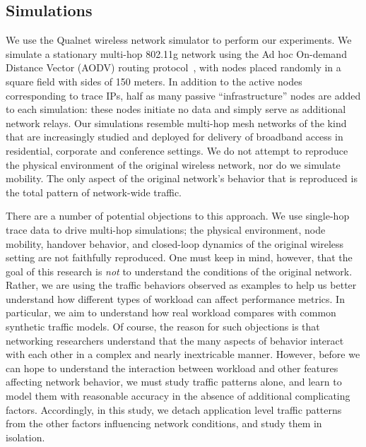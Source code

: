 \documentclass[conference]{IEEEtran}
\newcommand{\caps}[1]{{\small{#1}}}
\begin{document}
\subsection{Simulations}\label{sec:simulations}

We use the Qualnet wireless network simulator to perform our experiments. We simulate a stationary multi-hop 802.11g network using the Ad hoc On-demand Distance Vector (\caps{AODV}) routing protocol~\cite{rfc:aodv}, with nodes placed randomly in a square field with sides of 150 meters.
In addition to the active nodes corresponding to trace \caps{IP}s, half as many passive ``infrastructure'' nodes are added to each simulation: these nodes initiate no data and simply serve as additional network relays. Our simulations resemble multi-hop mesh networks of the kind that are increasingly studied and deployed for delivery of broadband access in residential, corporate and conference settings. We do not attempt to reproduce the physical environment of the original wireless network, nor do we simulate mobility. The only aspect of the original network's behavior that is reproduced is the total pattern of network-wide traffic.

There are a number of potential objections to this approach. We use single-hop trace data to drive multi-hop simulations; the physical environment, node mobility, handover behavior, and closed-loop dynamics of the original wireless setting are not faithfully reproduced. One must keep in mind, however, that the goal of this research is \textit{not} to understand the conditions of the original network. Rather, we are using the traffic behaviors observed as examples to help us better understand how different types of workload can affect performance metrics. In particular, we aim to understand how real workload compares with common synthetic traffic models. Of course, the reason for such objections is that networking researchers understand that the many aspects of behavior interact with each other in a complex and nearly inextricable manner. However, before we can hope to understand the interaction between workload and other features affecting network behavior, we must study traffic patterns alone, and learn to model them with reasonable accuracy in the absence of additional complicating factors. Accordingly, in this study, we detach application level traffic patterns from the other factors influencing network conditions, and study them in isolation.
\end{document}
